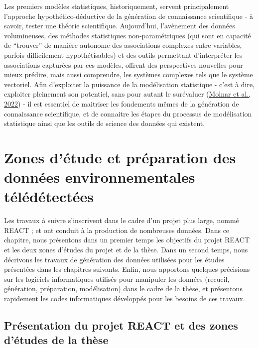 \documentclass[12pt,twoside]{reedthesis}
\begin{document}
Les premiers modèles statistiques, historiquement, servent principalement l'approche hypothético-déductive de la génération de connaissance scientifique - à savoir, tester une théorie scientifique. Aujourd'hui, l'avènement des données volumineuses, des méthodes statistiques non-paramétriques (qui sont en capacité de ``trouver'' de manière autonome des associations complexes entre variables, parfois difficilement hypothétisables) et des outils permettant d'interpréter les associations capturées par ces modèles, offrent des perspectives nouvelles pour mieux prédire, mais aussi comprendre, les systèmes complexes tels que le système vectoriel. Afin d'exploiter la puissance de la modélisation statistique - c'est à dire, exploiter pleinement son potentiel, sans pour autant le surévaluer (\protect\hyperlink{ref-holzinger_general_2022}{Molnar et al., 2022}) - il est essentiel de maitriser les fondements mêmes de la génération de connaissance scientifique, et de connaitre les étapes du processus de modélisation statistique ainsi que les outils de science des données qui existent.

\begingroup 
\renewcommand{\headrulewidth}{0pt}

\markboth{}{}


\endgroup

\hypertarget{data-collection-preparation}{%
\chapter{Zones d'étude et préparation des données environnementales télédétectées}\label{data-collection-preparation}}

Les travaux à suivre s'inscrivent dans le cadre d'un projet plus large, nommé REACT ; et ont conduit à la production de nombreuses données. Dans ce chapitre, nous présentons dans un premier temps les objectifs du projet REACT et les deux zones d'études du projet et de la thèse. Dans un second temps, nous décrivons les travaux de génération des données utilisées pour les études présentées dans les chapitres suivants. Enfin, nous apportons quelques précisions sur les logiciels informatiques utilisés pour manipuler les données (recueil, génération, préparation, modélisation) dans le cadre de la thèse, et présentons rapidement les codes informatiques développés pour les besoins de ces travaux.

\hypertarget{study-areas}{%
\section{Présentation du projet REACT et des zones d'études de la thèse}\label{study-areas}}
\end{document}
